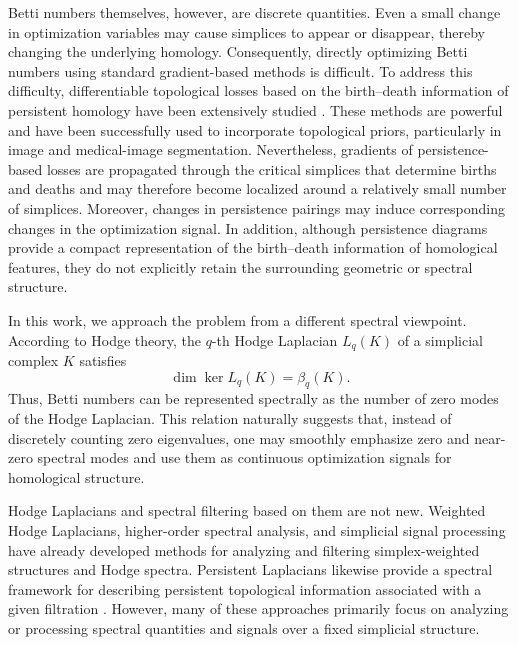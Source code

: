 \documentclass[pdflatex,sn-mathphys-num]{sn-jnl}%
\theoremstyle{thmstyleone}%
\theoremstyle{thmstyletwo}%
\theoremstyle{thmstylethree}%
\begin{document}
Betti numbers themselves, however, are discrete quantities. Even a small change in optimization variables may cause simplices to appear or disappear, thereby changing the underlying homology. Consequently, directly optimizing Betti numbers using standard gradient-based methods is difficult. To address this difficulty, differentiable topological losses based on the birth--death information of persistent homology have been extensively studied \cite{poulenard2018topological,chen2019topological,hu2019topology,nigmetov2024topological,leygonie2022framework,carriere2021optimizing,clough2020topological,gabrielsson2020topology,moor2020topological,vandaele2021topologically,hofer2020graph,solomon2021fast}. These methods are powerful and have been successfully used to incorporate topological priors, particularly in image and medical-image segmentation. Nevertheless, gradients of persistence-based losses are propagated through the critical simplices that determine births and deaths and may therefore become localized around a relatively small number of simplices\cite{nigmetov2024topological,leygonie2022framework}. Moreover, changes in persistence pairings may induce corresponding changes in the optimization signal. In addition, although persistence diagrams provide a compact representation of the birth--death information of homological features, they do not explicitly retain the surrounding geometric or spectral structure.

In this work, we approach the problem from a different spectral viewpoint. According to Hodge theory, the $q$-th Hodge Laplacian $L_q(K)$ of a simplicial complex $K$ satisfies
\[
\dim \ker L_q(K) = \beta_q(K).
\]
Thus, Betti numbers can be represented spectrally as the number of zero modes of the Hodge Laplacian. This relation naturally suggests that, instead of discretely counting zero eigenvalues, one may smoothly emphasize zero and near-zero spectral modes and use them as continuous optimization signals for homological structure.

Hodge Laplacians and spectral filtering based on them are not new. Weighted Hodge Laplacians\cite{horak2013spectra,schaub2020random,baccini2022weighted}, higher-order spectral analysis\cite{krishnagopal2021spectral,schaub2020random,baccini2022weighted}, and simplicial signal processing\cite{barbarossa2020topological,schaub2021signal,yang2022simplicial,isufi2022convolutional} have already developed methods for analyzing and filtering simplex-weighted structures and Hodge spectra. Persistent Laplacians likewise provide a spectral framework for describing persistent topological information associated with a given filtration \cite{memoli2022persistent,wei2025persistent,wang2020persistent}. However, many of these approaches primarily focus on analyzing or processing spectral quantities and signals over a fixed simplicial structure.
\end{document}
